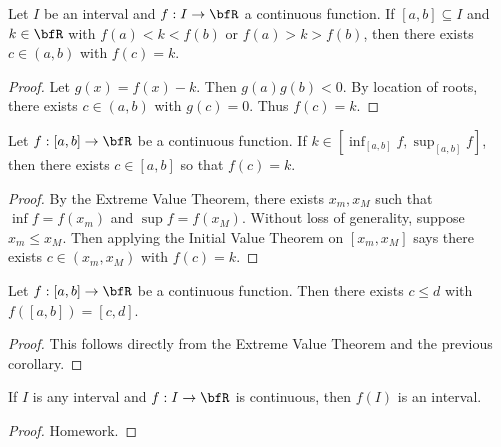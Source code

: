     \begin{theorem}
        Let $I$ be an interval and $f:I \rightarrow \bfR$ a continuous function. If $[a,b] \subseteq I$ and $k \in \bfR$ with $f(a) < k < f(b)$ or $f(a) > k > f(b)$, then there exists $c \in (a,b)$ with $f(c) = k$.
    \end{theorem}
        \begin{proof}
            Let $g(x) = f(x) - k$. Then $g(a)g(b) < 0$. By location of roots, there exists $c \in (a,b)$ with $g(c) = 0$. Thus $f(c) = k$.
        \end{proof}

    \begin{corollary}
        Let $f:[a,b] \rightarrow \bfR$ be a continuous function. If $k \in \left[\inf_{[a,b]}f , \sup_{[a,b]}f\right]$, then there exists $c \in [a,b]$ so that $f(c) = k$.
    \end{corollary}
        \begin{proof}
            By the Extreme Value Theorem, there exists $x_m,x_M$ such that $\inf f = f(x_m)$ and $\sup f = f(x_M)$. Without loss of generality, suppose $x_m \leq x_M$. Then applying the Initial Value Theorem on $[x_m,x_M]$ says there exists $c \in (x_m,x_M)$ with $f(c) = k$.
        \end{proof}

    \begin{corollary}
        Let $f:[a,b] \rightarrow \bfR$ be a continuous function. Then there exists $c \leq d$ with $f([a,b]) = [c,d]$.
    \end{corollary}
        \begin{proof}
            This follows directly from the Extreme Value Theorem and the previous corollary.
        \end{proof}

    \begin{corollary}
        If $I$ is any interval and $f:I \rightarrow \bfR$ is continuous, then $f(I)$ is an interval.
    \end{corollary}
        \begin{proof}
            Homework.
        \end{proof}

